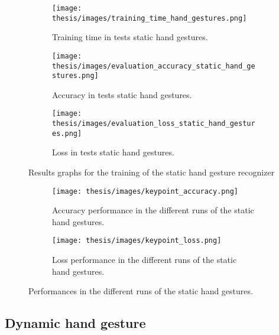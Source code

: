 \documentclass[../thesis.tex]{subfiles}
\begin{document}
\begin{figure}[H]
     \centering
     \begin{subfigure}[b]{0.45\textwidth}
         \centering
         \texttt{[image: thesis/images/training\_time\_hand\_gestures.png]}
         \caption{Training time in tests static hand gestures.}
         \label{fig:training_time_static_hand_gestures}
     \end{subfigure}
     \hfill
     \begin{subfigure}[b]{0.45\textwidth}
         \centering
         \texttt{[image: thesis/images/evaluation\_accuracy\_static\_hand\_gestures.png]}
         \caption{Accuracy in tests static hand gestures.}
         \label{fig:evaluation_accuracy_static_hand_gestures}
     \end{subfigure}
     \hfill
     \begin{subfigure}[b]{0.45\textwidth}
         \centering
         \texttt{[image: thesis/images/evaluation\_loss\_static\_hand\_gestures.png]}
         \caption{Loss in tests static hand gestures.}
         \label{fig:evaluation_loss_static_hand_gestures.}
     \end{subfigure}
        \caption{Results graphs for the training of the static hand gesture recognizer}
        \label{fig:results_graphs_static_hand_gestures}
\end{figure}

\begin{figure}[H]
    \centering
    \begin{subfigure}[b]{\textwidth}
        \texttt{[image: thesis/images/keypoint\_accuracy.png]}
        \caption{Accuracy performance in the different runs of the static hand gestures.}
        \label{fig:accuracy_performance_static_hand_gestures}
    \end{subfigure}
    \hfill
    \begin{subfigure}[b]{\textwidth}
        \texttt{[image: thesis/images/keypoint\_loss.png]}
        \caption{Loss performance in the different runs of the static hand gestures.}
        \label{fig:loss_performance_static_hand_gestures}
    \end{subfigure}
    \caption{Performances in the different runs of the static hand gestures.}
\end{figure}

\subsection{Dynamic hand gesture}
\end{document}
